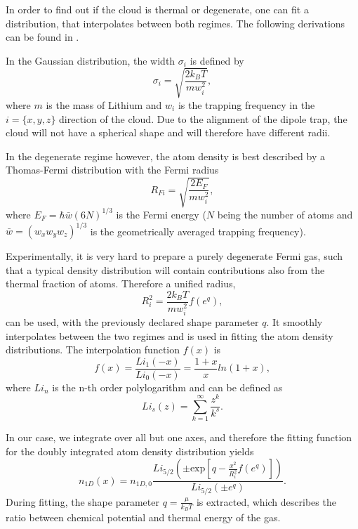 In order to find out if the cloud is thermal or degenerate, one can fit a distribution, that interpolates between both regimes. The following derivations can be found in \cite{Ketterle2008}.

In the Gaussian distribution, the width $\sigma_i$ is defined by
\begin{equation}
\sigma _i = \sqrt{\frac{2k_BT}{mw_i^2}},
\end{equation}
where $m$ is the mass of Lithium and $w_i$ is the trapping frequency in the $i=\{x,y,z\}$ direction of the cloud. Due to the alignment of the dipole trap, the cloud will not have a spherical shape and will therefore have different radii\cite{Heck2012}.

In the degenerate regime however, the atom density is best described by a Thomas-Fermi distribution with the Fermi radius
\begin{equation}
R_{Fi} = \sqrt{\frac{2E_F}{mw_i^2}},
\end{equation}
where $E_F=\hbar \bar{w} (6N)^{1/3}$ is the Fermi energy ($N$ being the number of atoms and $\bar{w}=(w_x w_y w_z)^{1/3}$ is the geometrically averaged trapping frequency).

Experimentally, it is very hard to prepare a purely degenerate Fermi gas, such that a typical density distribution will contain contributions also from the thermal fraction of atoms.
Therefore a unified radius,
\begin{equation}
R_i^2 = \frac{2k_BT}{mw_i^2}f( e^{q}),
\end{equation}
can be used, with the previously declared shape parameter $q$. It smoothly interpolates between the two regimes and is used in fitting the atom density distributions.
The interpolation function $f(x)$ is
\begin{equation}
f(x) = \frac{Li_1(-x)}{Li_0(-x)} = \frac{1+x}{x} ln(1+x),
\end{equation}
where $Li_n$ is the n-th order polylogarithm and can be defined as
\begin{equation}
Li_s(z) = \sum_{k=1}^{\infty} \frac{z^k}{k^s}.
\end{equation}

In our case, we integrate over all but one axes, and therefore the fitting function for the doubly integrated atom density distribution yields
\begin{equation}
\label{eq:n1d}
n_{1D}(x) = n_{1D,0}\frac{Li_{5/2}\left( \pm \mathrm{exp}\left[ q-\frac{x^2}{R_i^2}f(e^q)\right] \right)}{Li_{5/2}(\pm e^q)}.
\end{equation}
During fitting, the shape parameter $q=\frac{\mu}{k_B T}$ is extracted, which describes the ratio between chemical potential and thermal energy of the gas.

